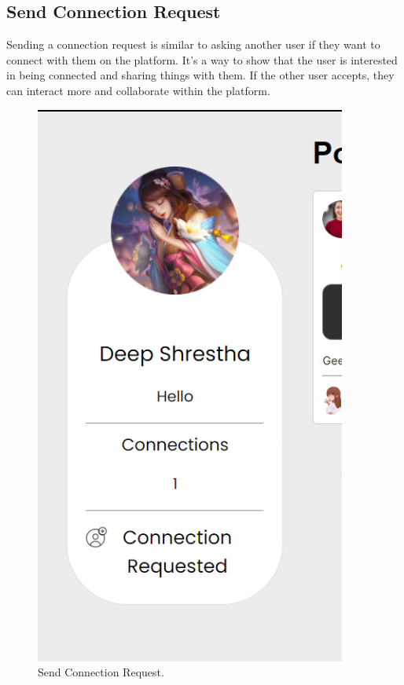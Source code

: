 \subsection{Send Connection Request}
Sending a connection request is similar to asking another user if they want to connect with them on the platform. It's a way to show that the user is interested in being connected and sharing things with them. If the other user accepts, they can interact more and collaborate within the platform.
\begin{figure}[H]
    \centering
    \includegraphics[height=0.3\textheight]{Outcome-ss/connection-request.png}
    \caption{Send Connection Request.}
    \label{fig:Send Connection Request}
\end{figure}

\newpage
